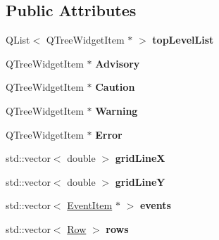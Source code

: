 \subsection*{Public Attributes}
\begin{DoxyCompactItemize}
\item 
Q\+List$<$ Q\+Tree\+Widget\+Item $\ast$ $>$ {\bfseries top\+Level\+List}\hypertarget{class_graph_adc81e96a9093f4d2885909c44ae23ab0}{}\label{class_graph_adc81e96a9093f4d2885909c44ae23ab0}

\item 
Q\+Tree\+Widget\+Item $\ast$ {\bfseries Advisory}\hypertarget{class_graph_a3d5a1c394c83271640b26f8c535a5d79}{}\label{class_graph_a3d5a1c394c83271640b26f8c535a5d79}

\item 
Q\+Tree\+Widget\+Item $\ast$ {\bfseries Caution}\hypertarget{class_graph_a4e6c9011a39cbe5065e00979c28b9bcf}{}\label{class_graph_a4e6c9011a39cbe5065e00979c28b9bcf}

\item 
Q\+Tree\+Widget\+Item $\ast$ {\bfseries Warning}\hypertarget{class_graph_a1aba958c0362b6b26215c038f4ec7b43}{}\label{class_graph_a1aba958c0362b6b26215c038f4ec7b43}

\item 
Q\+Tree\+Widget\+Item $\ast$ {\bfseries Error}\hypertarget{class_graph_a546945d6848c395d82933e0932459a56}{}\label{class_graph_a546945d6848c395d82933e0932459a56}

\item 
std\+::vector$<$ double $>$ {\bfseries grid\+LineX}\hypertarget{class_graph_aaa21fee2c958db9ce8492bc07c8429c9}{}\label{class_graph_aaa21fee2c958db9ce8492bc07c8429c9}

\item 
std\+::vector$<$ double $>$ {\bfseries grid\+LineY}\hypertarget{class_graph_a43990e5e608d45070455dbcf412514f4}{}\label{class_graph_a43990e5e608d45070455dbcf412514f4}

\item 
std\+::vector$<$ \hyperlink{struct_graph_1_1_event_item}{Event\+Item} $\ast$ $>$ {\bfseries events}\hypertarget{class_graph_a7274fc075b33d6c87ba7d40cf66b35d6}{}\label{class_graph_a7274fc075b33d6c87ba7d40cf66b35d6}

\item 
std\+::vector$<$ \hyperlink{struct_graph_1_1_row}{Row} $>$ {\bfseries rows}\hypertarget{class_graph_abf9b4e4d0ea804f9fe22a9a46c0257f7}{}\label{class_graph_abf9b4e4d0ea804f9fe22a9a46c0257f7}


\end{DoxyCompactItemize}
